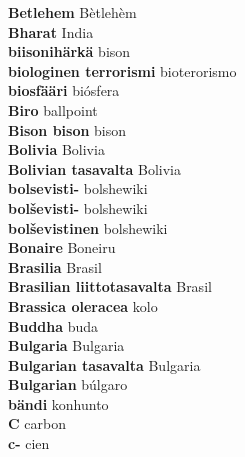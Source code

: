 \textbf{ Betlehem  } Bètlehèm \\
\textbf{ Bharat  } India \\
\textbf{ biisonihärkä  } bison \\
\textbf{ biologinen terrorismi  } bioterorismo \\
\textbf{ biosfääri  } biósfera \\
\textbf{ Biro  } ballpoint \\
\textbf{ Bison bison  } bison \\
\textbf{ Bolivia  } Bolivia \\
\textbf{ Bolivian tasavalta  } Bolivia \\
\textbf{ bolsevisti-  } bolshewiki \\
\textbf{ bolševisti-  } bolshewiki \\
\textbf{ bolševistinen  } bolshewiki \\
\textbf{ Bonaire  } Boneiru \\
\textbf{ Brasilia  } Brasil \\
\textbf{ Brasilian liittotasavalta  } Brasil \\
\textbf{ Brassica oleracea  } kolo \\
\textbf{ Buddha  } buda \\
\textbf{ Bulgaria  } Bulgaria \\
\textbf{ Bulgarian tasavalta  } Bulgaria \\
\textbf{ Bulgarian  } búlgaro \\
\textbf{ bändi  } konhunto \\
\textbf{ C  } carbon \\
\textbf{ c-  } cien \\
